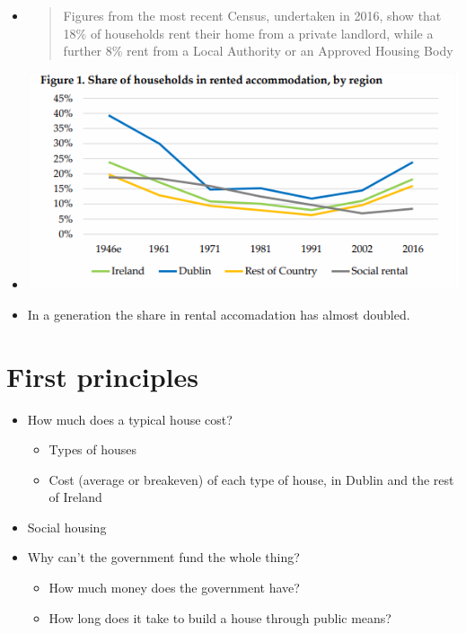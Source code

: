 \documentclass[11pt]{article}
\begin{document}
\begin{itemize}
\item
  \begin{quote}
  Figures from the most recent Census, undertaken in 2016, show that
  18\% of households rent their home from a private landlord, while a
  further 8\% rent from a Local Authority or an Approved Housing Body
  \end{quote}
\item
  \includegraphics{img/shareofhouseholdsinrental.png}
\item
  In a generation the share in rental accomadation has almost doubled.
\end{itemize}

\hypertarget{first-principles}{%
\section{First principles}\label{first-principles}}

\begin{itemize}
\tightlist
\item
  How much does a typical house cost?

  \begin{itemize}
  \tightlist
  \item
    Types of houses
  \item
    Cost (average or breakeven) of each type of house, in Dublin and the
    rest of Ireland
  \end{itemize}
\item
  Social housing
\item
  Why can't the government fund the whole thing?

  \begin{itemize}
  \tightlist
  \item
    How much money does the government have?
  \item
    How long does it take to build a house through public means?
  \end{itemize}
\end{itemize}
\end{document}
